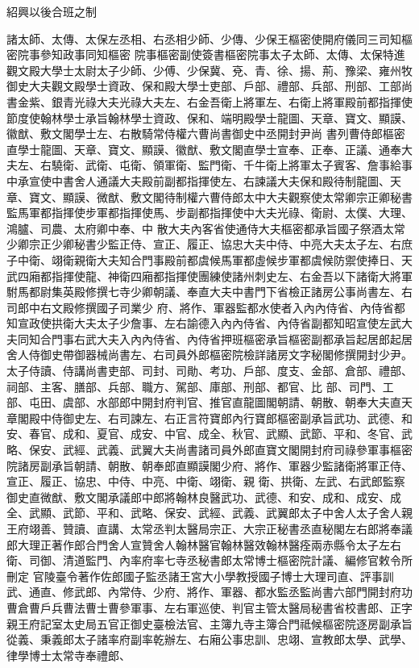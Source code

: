 \begin{pinyinscope}
 紹興以後合班之制



 諸太師、太傳、太保左丞相、右丞相少師、少傳、少保王樞密使開府儀同三司知樞密院事參知政事同知樞密
 院事樞密副使簽書樞密院事太子太師、太傳、太保特進觀文殿大學士太尉太子少師、少傅、少保冀、兗、青、徐、揚、荊、豫梁、雍州牧御史大夫觀文殿學士資政、保和殿大學士吏部、戶部、禮部、兵部、刑部、工部尚書金紫、銀青光祿大夫光祿大夫左、右金吾衛上將軍左、右衛上將軍殿前都指揮使節度使翰林學士承旨翰林學士資政、保和、端明殿學士龍圖、天章、寶文、顯謨、徽猷、敷文閣學士左、右散騎常侍權六曹尚書御史中丞開封尹尚
 書列曹侍郎樞密直學士龍圖、天章、寶文、顯謨、徽猷、敷文閣直學士宣奉、正奉、正議、通奉大夫左、右驍衛、武衛、屯衛、領軍衛、監門衛、千牛衛上將軍太子賓客、詹事給事中承宣使中書舍人通議大夫殿前副都指揮使左、右諫議大夫保和殿待制龍圖、天章、寶文、顯謨、微猷、敷文閣待制權六曹侍郎太中大夫觀察使太常卿宗正卿秘書監馬軍都指揮使步軍都指揮使馬、步副都指揮使中大夫光祿、衛尉、太僕、大理、鴻臚、司農、太府卿中奉、中
 散大夫內客省使通侍大夫樞密都承旨國子祭酒太常少卿宗正少卿秘書少監正侍、宣正、履正、協忠大夫中侍、中亮大夫太子左、右庶子中衛、翊衛親衛大夫知合門事殿前都虞候馬軍都虛候步軍都虞候防禦使捧日、天武四廂都指揮使龍、神衛四廂都指揮使團練使諸州刺史左、右金吾以下諸衛大將軍駙馬都尉集英殿修撰七寺少卿朝議、奉直大夫中書門下省檢正諸房公事尚書左、右司郎中右文殿修撰國子司業少
 府、將作、軍器監都水使者入內內侍省、內侍省都知宣政使拱衛大夫太子少詹事、左右諭德入內內侍省、內侍省副都知昭宣使左武大夫同知合門事右武大夫入內內侍省、內侍省押班樞密承旨樞密副都承旨起居郎起居舍人侍御史帶御器械尚書左、右司員外郎樞密院檢詳諸房文字秘閣修撰開封少尹。太子侍讀、侍講尚書吏部、司封、司勛、考功、戶部、度支、金部、倉部、禮部、祠部、主客、膳部、兵部、職方、駕部、庫部、刑部、都官、比
 部、司門、工部、屯田、虞部、水部郎中開封府判官、推官直龍圖閣朝請、朝散、朝奉大夫直天章閣殿中侍御史左、右司諫左、右正言符寶郎內行寶郎樞密副承旨武功、武德、和安、春官、成和、夏官、成安、中官、成全、秋官、武顯、武節、平和、冬官、武略、保安、武經、武義、武翼大夫尚書諸司員外郎直寶文閣開封府司祿參軍事樞密院諸房副承旨朝請、朝散、朝奉郎直顯謨閣少府、將作、軍器少監諸衛將軍正侍、宣正、履正、協忠、中侍、中亮、中衛、翊衛、親
 衛、拱衛、左武、右武郎監察御史直微猷、敷文閣承議郎中郎將翰林良醫武功、武德、和安、成和、成安、成全、武顯、武節、平和、武略、保安、武經、武義、武翼郎太子中舍人太子舍人親王府翊善、贊讀、直講、太常丞判太醫局宗正、大宗正秘書丞直秘閣左右郎將奉議郎大理正著作郎合門舍人宣贊舍人翰林醫官翰林醫效翰林醫痊兩赤縣令太子左右衛、司御、清道監門、內率府率七寺丞秘書郎太常博士樞密院計議、編修官敕令所刪定
 官陵臺令著作佐郎國子監丞諸王宮大小學教授國子博士大理司直、評事訓武、通直、修武郎、內常侍、少府、將作、軍器、都水監丞監尚書六部門開封府功曹倉曹戶兵曹法曹士曹參軍事、左右軍巡使、判官主管太醫局秘書省校書郎、正字親王府記室太史局五官正御史臺檢法官、主簿九寺主簿合門祗候樞密院逐房副承旨從義、秉義郎太子諸率府副率乾辦左、右廂公事忠訓、忠翊、宣教郎太學、武學、律學博士太常寺奉禮郎、

\end{pinyinscope}

